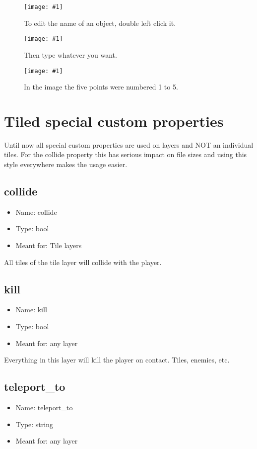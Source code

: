 \documentclass{article}
\newcommand{\erklaerbild}[2]{
	\begin{figure}[H]
		\center
		\texttt{[image: \#1]}
		\caption{#2}
	\end{figure}
}
\begin{document}
\erklaerbild
	{object_list_4_edit.png}
	{To edit the name of an object, double left click it.}

\erklaerbild
	{object_list_5.png}
	{Then type whatever you want.}

\erklaerbild
	{object_list_6.png}
	{In the image the five points were numbered 1 to 5.}

\section{Tiled special custom properties}
Until now all special custom properties are used on layers and NOT an individual tiles. For the collide property this has serious impact on file sizes and using this style everywhere makes the usage easier.

\subsection{collide}
\begin{itemize}
	\item Name: collide
	\item Type: bool
	\item Meant for: Tile layers
\end{itemize}

All tiles of the tile layer will collide with the player.

\subsection{kill}
\begin{itemize}
	\item Name: kill
	\item Type: bool
	\item Meant for: any layer
\end{itemize}

Everything in this layer will kill the player on contact. Tiles, enemies, etc.

\subsection{teleport\_to}
\begin{itemize}
	\item Name: teleport\_to
	\item Type: string
	\item Meant for: any layer
\end{itemize}
\end{document}
